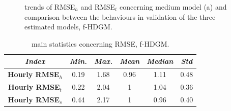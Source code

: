 \begin{figure}
	\centering
	\quad
	\quad
	\caption[Trends of RMSE$_h$ and RMSE$_t$ concerning medium model (a) and comparison between the behaviours in validation of the three estimated models (f-HDGM)]{trends of RMSE$_h$ and RMSE$_t$ concerning medium model (a) and comparison between the behaviours in validation of the three estimated models, f-HDGM.}
\end{figure}

\begin{table}
	\centering
	\renewcommand\arraystretch{1.3}
	\begin{tabular}{c|c|c|c|c|c}
		\hline
		\textit{Index} & \textit{Min.} & \textit{Max.} & \textit{Mean} & \textit{Median} & \textit{Std}\\
		\hline
		\textbf{Hourly RMSE$_h$} & \num{0.19} & \num{1.68} & \num{0.96} & \num{1.11} & \num{0.48}\\
		\hline
		\textbf{Hourly RMSE$_t$} & \num{0.22} & \num{2.04} & \num{1} & \num{1.04} & \num{0.36} \\
		\hline
		\textbf{Hourly RMSE$_s$} & \num{0.44} & \num{2.17} & \num{1} & \num{0.96} & \num{0.40}\\
		\hline
	\end{tabular}
	\caption[Main statistics concerning RMSE (f-HDGM)]{main statistics concerning RMSE, f-HDGM.}
	\label{RMSE_f-HDGM_stats}
\end{table}